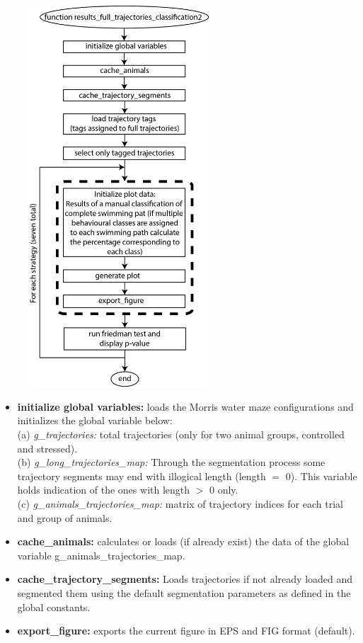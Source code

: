 \documentclass[12pt,titlepage]{article}
\begin{document}
\begin{doublespace}
\begin{figure}[H]
	\begin{center}
		\includegraphics[width=0.6\textwidth]{results_full_trajectories_classification2.jpg}
		\label{sfig4}
	\end{center}
\end{figure}

\begin{itemize}
	\item\textbf{initialize global variables:} loads the Morris water maze configurations and initializes the global variable below:\\
	(a) \textit{g\_trajectories:} total trajectories (only for two animal groups, controlled and stressed).\\
	(b) \textit{g\_long\_trajectories\_map:} Through the segmentation process some trajectory segments may end with illogical length (length $=$ 0). This variable holds  indication of the ones with length $>$ 0 only.\\
	(c) \textit{g\_animals\_trajectories\_map:} matrix of trajectory indices for each trial and group of animals.
	\item\textbf{cache\_animals:} calculates or loads (if already exist) the data of the global variable g\_animals\_trajectories\_map.
	\item\textbf{cache\_trajectory\_segments:} Loads trajectories if not already loaded and segmented them using the default segmentation parameters as defined in the global constants.
	\item\textbf{export\_figure:} exports the current figure in EPS and FIG format (default).
\end{itemize}


\end{doublespace}
\end{document}
